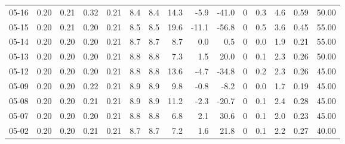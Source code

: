 \begin{threeparttable}
{\begin{tabular}{lrrrrrrrrrrrrrr}
  05-16 &          0.20 &          0.21 &          0.32 &        0.21 &                 8.4 &                8.4 &                14.3 &       -5.9 &        -41.0 &              0 &                 0.3 &              4.6 &            0.59 &                  50.00 \\
  05-15 &          0.20 &          0.21 &          0.20 &        0.21 &                 8.5 &                8.5 &                19.6 &      -11.1 &        -56.8 &              0 &                 0.5 &              3.6 &            0.45 &                  55.00 \\
  05-14 &          0.20 &          0.20 &          0.20 &        0.21 &                 8.7 &                8.7 &                 8.7 &        0.0 &          0.5 &              0 &                 0.0 &              1.9 &            0.21 &                  55.00 \\
  05-13 &          0.20 &          0.20 &          0.20 &        0.21 &                 8.8 &                8.8 &                 7.3 &        1.5 &         20.0 &              0 &                 0.1 &              2.3 &            0.26 &                  50.00 \\
  05-12 &          0.20 &          0.20 &          0.20 &        0.21 &                 8.8 &                8.8 &                13.6 &       -4.7 &        -34.8 &              0 &                 0.2 &              2.3 &            0.26 &                  45.00 \\
  05-09 &          0.20 &          0.20 &          0.22 &        0.21 &                 8.9 &                8.9 &                 9.8 &       -0.8 &         -8.2 &              0 &                 0.0 &              1.7 &            0.19 &                  45.00 \\
  05-08 &          0.20 &          0.20 &          0.21 &        0.21 &                 8.9 &                8.9 &                11.2 &       -2.3 &        -20.7 &              0 &                 0.1 &              2.4 &            0.28 &                  45.00 \\
  05-07 &          0.20 &          0.20 &          0.20 &        0.21 &                 8.8 &                8.8 &                 6.8 &        2.1 &         30.6 &              0 &                 0.1 &              2.0 &            0.23 &                  45.00 \\
  05-02 &          0.20 &          0.20 &          0.21 &        0.21 &                 8.7 &                8.7 &                 7.2 &        1.6 &         21.8 &              0 &                 0.1 &              2.2 &            0.27 &                  40.00 \\

\end{tabular}}
\end{threeparttable}
